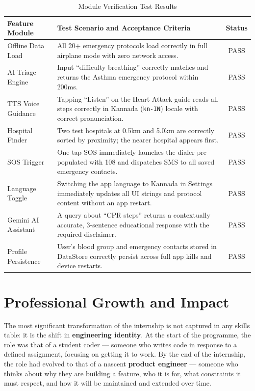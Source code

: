 \documentclass[12pt,a4paper]{report}
\begin{document}
\begin{table}[H]
\centering
\begin{tabularx}{\textwidth}{|l|X|c|}
\hline
\rowcolor[gray]{0.9} \textbf{Feature Module} & \textbf{Test Scenario and Acceptance Criteria} & \textbf{Status} \\ \hline
Offline Data Load & All 20+ emergency protocols load correctly in full airplane mode with zero network access. & PASS \\ \hline
AI Triage Engine & Input ``difficulty breathing'' correctly matches and returns the Asthma emergency protocol within 200ms. & PASS \\ \hline
TTS Voice Guidance & Tapping ``Listen'' on the Heart Attack guide reads all steps correctly in Kannada (\texttt{kn-IN}) locale with correct pronunciation. & PASS \\ \hline
Hospital Finder & Two test hospitals at 0.5km and 5.0km are correctly sorted by proximity; the nearer hospital appears first. & PASS \\ \hline
SOS Trigger & One-tap SOS immediately launches the dialer pre-populated with 108 and dispatches SMS to all saved emergency contacts. & PASS \\ \hline
Language Toggle & Switching the app language to Kannada in Settings immediately updates all UI strings and protocol content without an app restart. & PASS \\ \hline
Gemini AI Assistant & A query about ``CPR steps'' returns a contextually accurate, 3-sentence educational response with the required disclaimer. & PASS \\ \hline
Profile Persistence & User's blood group and emergency contacts stored in DataStore correctly persist across full app kills and device restarts. & PASS \\ \hline
\end{tabularx}
\caption{Module Verification Test Results}
\end{table}

\section{Professional Growth and Impact}

The most significant transformation of the internship is not captured in any skills table: it is the shift in \textbf{engineering identity}. At the start of the programme, the role was that of a student coder — someone who writes code in response to a defined assignment, focusing on getting it to work. By the end of the internship, the role had evolved to that of a nascent \textbf{product engineer} — someone who thinks about why they are building a feature, who it is for, what constraints it must respect, and how it will be maintained and extended over time.
\end{document}
